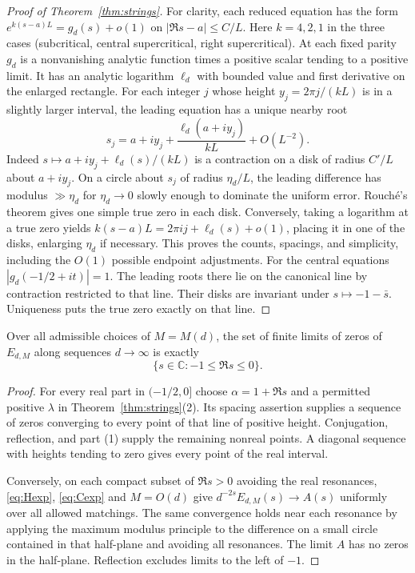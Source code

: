 \begin{proof}[Proof of Theorem~\ref{thm:strings}]
For clarity, each reduced equation has the form
$e^{k(s-a)L}=g_d(s)+o(1)$ on $|\Re s-a|\le C/L$.
Here $k=4,2,1$ in the three cases (subcritical, central supercritical,
right supercritical). At each fixed parity $g_d$ is a nonvanishing
analytic function times a positive scalar tending to a positive limit.
It has an analytic logarithm $\ell_d$ with bounded value and first
derivative on the enlarged rectangle. For each integer $j$ whose height
$y_j=2\pi j/(kL)$ is in a slightly larger interval, the leading equation
has a unique nearby root
\[
 s_j=a+iy_j+\frac{\ell_d(a+iy_j)}{kL}+O(L^{-2}).
\]
Indeed $s\mapsto a+iy_j+\ell_d(s)/(kL)$ is a contraction on a disk
of radius $C'/L$ about $a+iy_j$. On a circle about $s_j$ of radius
$\eta_d/L$, the leading difference has modulus $\gg\eta_d$ for
$\eta_d\to0$ slowly enough to dominate the uniform error. Rouch\'e's
theorem gives one simple true zero in each disk. Conversely, taking
a logarithm at a true zero yields $k(s-a)L=2\pi i j+\ell_d(s)+o(1)$,
placing it in one of the disks, enlarging $\eta_d$ if necessary.
This proves the counts, spacings, and simplicity, including the
$O(1)$ possible endpoint adjustments. For the central equations
$|g_d(-1/2+it)|=1$. The leading roots there lie on the canonical line
by contraction restricted to that line. Their disks
are invariant under $s\mapsto-1-\bar s$. Uniqueness puts the true
zero exactly on that line.
\end{proof}

\begin{corollary}\label{cor:strip}
Over all admissible choices of $M=M(d)$, the set of finite limits of
zeros of $E_{d,M}$ along sequences $d\to\infty$ is exactly
\[
                     \{s\in\mathbb C:-1\le\Re s\le0\}.
\]
\end{corollary}
\begin{proof}
For every real part in $(-1/2,0]$ choose $\alpha=1+\Re s$ and a
permitted positive $\lambda$ in Theorem~\ref{thm:strings}(2).
Its spacing assertion supplies a sequence of zeros converging to
every point of that line of positive height. Conjugation, reflection,
and part (1) supply the remaining nonreal points. A diagonal sequence
with heights tending to zero gives every point of the real interval.

Conversely, on each compact subset of $\Re s>0$ avoiding the real
resonances, \eqref{eq:Hexp}, \eqref{eq:Cexp} and $M=O(d)$ give
$d^{-2s}E_{d,M}(s)\to A(s)$ uniformly over all allowed matchings.
The same convergence holds near each resonance by applying the maximum
modulus principle to the difference on a small circle contained in
that half-plane and avoiding all resonances. The limit $A$ has no zeros
in the half-plane. Reflection excludes limits to the left of $-1$.
\end{proof}

